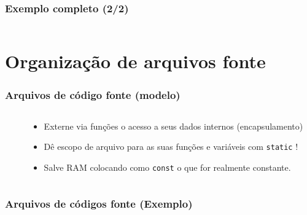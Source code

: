\documentclass{beamer}
\begin{document}
\begin{frame}
	\frametitle{Exemplo completo (2/2)}
	\begin{columns}[T] %
		\begin{column}{.5\textwidth}
		
			\end{column}%
		\hfill%
		\begin{column}{.5\textwidth}
		
		\end{column}%
	\end{columns}
\end{frame}

\section{Organização de arquivos fonte}

\begin{frame}
	\frametitle{Arquivos de código fonte (modelo)}
	\begin{columns}[T] %
		\begin{column}{.60\textwidth}
			
		\end{column}%
		\hfill%
		\begin{column}{.40\textwidth}
			\begin{itemize}
				\item Externe via funções o acesso a seus dados internos (encapsulamento)
				\item Dê escopo de arquivo para as suas funções e variáveis com \texttt{static} !
				\item Salve RAM colocando como \texttt{const} o que for realmente constante.
			\end{itemize}
		\end{column}%
	\end{columns}
\end{frame}

\begin{frame}
	\frametitle{Arquivos de códigos fonte (Exemplo)}
	
\end{frame}
\end{document}
